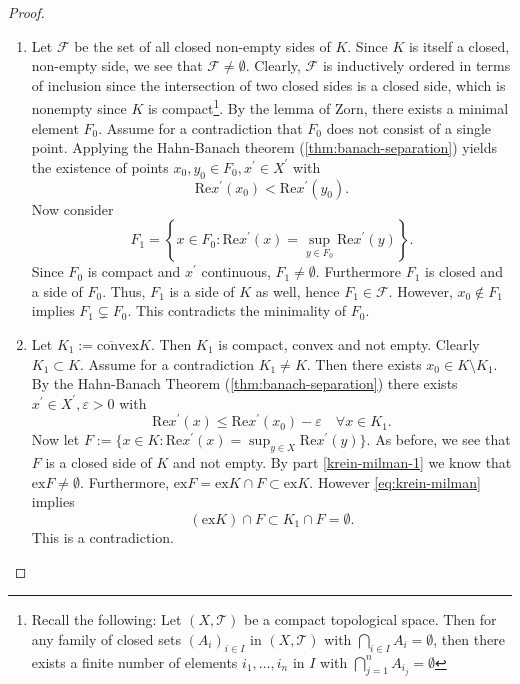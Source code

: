\begin{proof}
	\begin{enumerate}
		\item Let $\mathcal{F}$ be the set of all  closed non-empty sides of $K$.  Since $K$ is itself a closed, non-empty side, we see that $\mathcal{F}\neq \emptyset$. Clearly, $\mathcal{F}$ is inductively ordered in terms of inclusion since the intersection of two closed sides is a closed side, which is nonempty since $K$ is compact\footnote{Recall the following: Let $(X,\mathcal{T})$ be a compact topological space. Then for any family of closed sets $(A_i)_{i\in I}$ in $(X,\mathcal{T})$ with $\bigcap_{i\in I}A_i=\emptyset$, then there exists a finite number of elements $i_1,\dots, i_n$ in $I$ with $\bigcap_{j=1}^n A_{i_j}=\emptyset$}. By the lemma of Zorn, there exists a minimal element $F_0$. Assume for a contradiction that $F_0$ does not consist of a single point. Applying the Hahn-Banach theorem (\autoref{thm:banach-separation}) yields the existence of points $x_0,y_0\in F_0, x^\prime\in X^\prime$ with
		\[
		\mathrm{Re}x^\prime(x_0)<\mathrm{Re}x^\prime(y_0).
		\]
		Now consider
		\[
		F_1=\left\{x\in F_0\colon \mathrm{Re}x^\prime(x)=\sup_{y\in F_0}\mathrm{Re}x^\prime(y)
		\right\}.
		\]
		Since $F_0$ is compact and $x^\prime$ continuous, $F_1\neq \emptyset$. Furthermore $F_1$ is closed and a side of $F_0$. Thus, $F_1$ is a side of $K$ as well, hence $F_1\in \mathcal{F}$. However, $x_0\not\in F_1$ implies $F_1\subsetneq F_0$. This contradicts the minimality of $F_0$.
		
		\item Let $K_1:=\overline{\mathrm{conv}}\mathrm{ex}K$. Then $K_1$ is compact, convex and not empty. Clearly $K_1\subset K$. Assume for a contradiction $K_1\neq K$. Then there exists $x_0\in K\setminus K_1$. By the Hahn-Banach Theorem (\autoref{thm:banach-separation}) there exists $x^\prime \in X^\prime, \varepsilon>0$ with
	\begin{equation}\label{eq:krein-milman}
	\mathrm{Re}x^\prime(x)\leq \mathrm{Re}x^\prime(x_0)-\varepsilon\quad \forall x\in K_1.
	\end{equation}
	Now let $F:=\{x\in K\colon \mathrm{Re}x^\prime(x)=\sup_{y\in X}\mathrm{Re}x^\prime(y)\}$. As before, we see that $F$ is a closed side of $K$ and not empty. By part \ref{krein-milman-1} we know that $\mathrm{ex}F\neq \emptyset$. Furthermore, $\mathrm{ex}F=\mathrm{ex}K\cap F\subset \mathrm{ex}K$. However \eqref{eq:krein-milman} implies 
	\[
	(\mathrm{ex}K)\cap F\subset K_1\cap F=\emptyset.
	\]
	This is a contradiction.\qedhere
\end{enumerate}
\end{proof}


